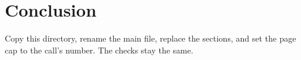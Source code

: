 \section{Conclusion}

Copy this directory, rename the main file, replace the sections, and set the
page cap to the call's number. The checks stay the same.
